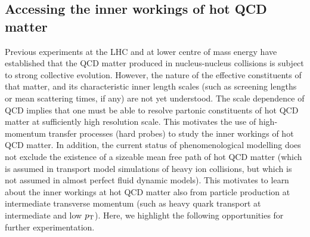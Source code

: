\documentclass[../report.tex]{subfiles}
\begin{document}
\subsection{Accessing the inner workings of hot QCD matter}
Previous experiments at the LHC and at lower centre of mass energy have established that the QCD matter produced in nucleus-nucleus collisions is subject to strong collective evolution. However, the nature of the effective constituents of that matter, and its characteristic inner length scales (such as screening lengths or mean scattering times, if any) are not yet understood. The scale dependence of QCD implies that one must be able to resolve partonic constituents of hot QCD matter at sufficiently high resolution scale. This motivates the use of high-momentum transfer processes (hard probes) to study the inner workings of hot QCD matter. In addition, the current status of phenomenological modelling does not exclude the existence of a sizeable mean free path of hot QCD matter (which is assumed in transport model simulations of heavy ion collisions, but which is not assumed in almost perfect fluid dynamic models). This motivates to learn about the inner workings at hot QCD matter also from particle production at intermediate transverse momentum (such as heavy quark transport at intermediate and low $p\sb{\scriptstyle\mathrm{T}}$). Here, we highlight the following opportunities for further experimentation.
\end{document}
